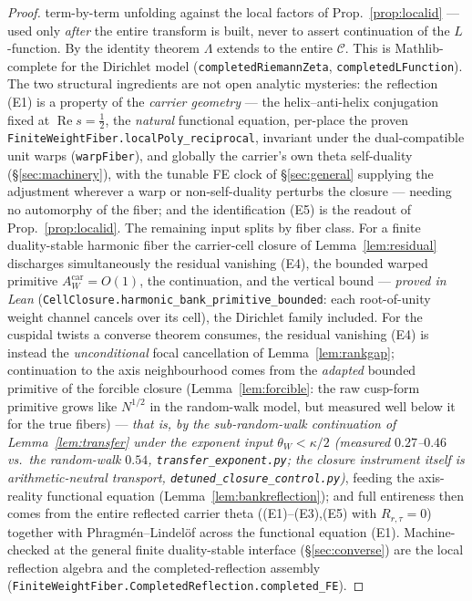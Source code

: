 \documentclass[11pt]{article}
\theoremstyle{definition}
\renewcommand{\Re}{\operatorname{Re}}
\begin{document}
\begin{proof}
term-by-term unfolding against the local factors of Prop.~\ref{prop:localid} --- used only \emph{after} the
entire transform is built, never to assert continuation of the $L$-function. By the identity theorem
$\Lambda$ extends to the entire $\mathcal C$. This is Mathlib-complete for the Dirichlet model
(\texttt{completedRiemannZeta}, \texttt{completedLFunction}). The two structural ingredients are not open
analytic mysteries: the reflection \textup{(E1)} is a property of the \emph{carrier geometry} --- the
helix--anti-helix conjugation fixed at $\Re s=\tfrac12$, the \emph{natural} functional equation, per-place
the proven \texttt{FiniteWeightFiber.localPoly\_reciprocal}, invariant under the dual-compatible unit warps
(\texttt{warpFiber}), and globally the carrier's own theta self-duality (\S\ref{sec:machinery}), with the
tunable FE clock of \S\ref{sec:general} supplying the adjustment wherever a warp or non-self-duality
perturbs the closure --- needing no automorphy of the fiber; and the identification \textup{(E5)} is the
readout of Prop.~\ref{prop:localid}. The remaining input splits by fiber class. For a finite duality-stable
harmonic fiber the carrier-cell closure of Lemma~\ref{lem:residual} discharges simultaneously the residual
vanishing \textup{(E4)}, the bounded warped primitive $A^{\mathrm{car}}_W=O(1)$, the continuation, and the
vertical bound --- \emph{proved in Lean} (\texttt{CellClosure.harmonic\_bank\_primitive\_bounded}: each
root-of-unity weight channel cancels over its cell), the Dirichlet family included. For the cuspidal twists a
converse theorem consumes, the residual vanishing \textup{(E4)} is instead the \emph{unconditional} focal
cancellation of Lemma~\ref{lem:rankgap}; continuation to the axis neighbourhood comes from the \emph{adapted}
bounded primitive of the forcible closure (Lemma~\ref{lem:forcible}: the raw cusp-form primitive grows like
$N^{1/2}$ in the random-walk model, but measured well below it for the true fibers) --- \emph{that is, by the
sub-random-walk continuation of Lemma~\ref{lem:transfer} under the exponent input $\theta_W<\kappa/2$
(measured $0.27$--$0.46$ vs.\ the random-walk $0.54$, \texttt{transfer\_exponent.py}; the closure instrument
itself is arithmetic-neutral transport, \texttt{detuned\_closure\_control.py})}, feeding the axis-reality
functional equation (Lemma~\ref{lem:bankreflection}); and full entireness then comes from the entire reflected carrier theta
(\textup{(E1)--(E3),(E5)} with $R_{r,\tau}=0$) together with Phragm\'en--Lindel\"of across the functional
equation \textup{(E1)}. Machine-checked at the general finite
duality-stable interface (\S\ref{sec:converse}) are the local reflection algebra and the
completed-reflection assembly (\texttt{FiniteWeightFiber.CompletedReflection.completed\_FE}).
\end{proof}
\end{document}
